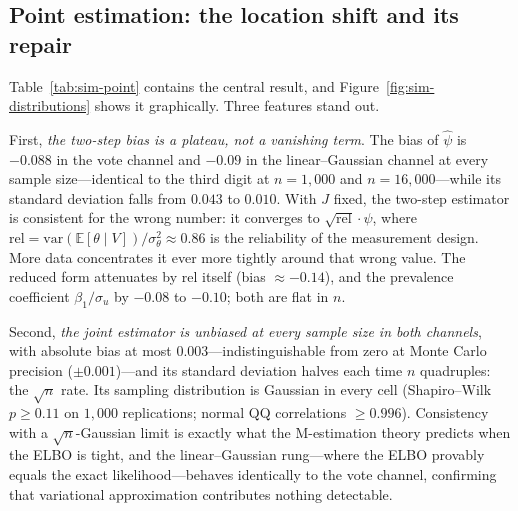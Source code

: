 \subsection{Point estimation: the location shift and its repair}
\label{sec:sim-point}

\begin{table}[t]
\centering
\caption{Bias, standard deviation, and RMSE of $\hat\psi$ (truth
$\psi=1.118$) across $1{,}000$ replications per cell.  Two-step: OLS on
posterior means from the unsupervised fit.  Joint: supervised ELBO,
structural readout.  Post-fit OLS: least squares of $y$ on outcome-free
posterior means under the jointly fitted measurement model.}
\label{tab:sim-point}

\end{table}

Table~\ref{tab:sim-point} contains the central result, and
Figure~\ref{fig:sim-distributions} shows it graphically.  Three features
stand out.

First, \emph{the two-step bias is a plateau, not a vanishing term}.  The
bias of $\hat\psi$ is $-0.088$ in the vote channel and $-0.09$ in the
linear--Gaussian channel at every sample size---identical to the third
digit at $n=1{,}000$ and $n=16{,}000$---while its standard deviation falls
from $0.043$ to $0.010$.  With $J$ fixed, the two-step estimator is
consistent for the wrong number: it converges to
$\sqrt{\mathrm{rel}}\cdot\psi$, where
$\mathrm{rel}=\mathrm{var}(\mathbb{E}[\theta\mid V])/\sigma_\theta^2\approx0.86$
is the reliability of the measurement design.  More data concentrates it
ever more tightly around that wrong value.  The reduced form attenuates by
$\mathrm{rel}$ itself (bias $\approx-0.14$), and the prevalence coefficient
$\beta_1/\sigma_u$ by $-0.08$ to $-0.10$; both are flat in $n$.

Second, \emph{the joint estimator is unbiased at every sample size in both
channels}, with absolute bias at most $0.003$---indistinguishable from zero
at Monte Carlo precision ($\pm0.001$)---and its standard deviation halves
each time $n$ quadruples: the $\sqrt{n}$ rate.  Its sampling distribution
is Gaussian in every cell (Shapiro--Wilk $p\ge0.11$ on $1{,}000$
replications; normal QQ correlations $\ge0.996$).  Consistency with a
$\sqrt{n}$-Gaussian limit is exactly what the M-estimation theory predicts
when the ELBO is tight, and the linear--Gaussian rung---where the ELBO
provably equals the exact likelihood---behaves identically to the vote
channel, confirming that variational approximation contributes nothing
detectable.

